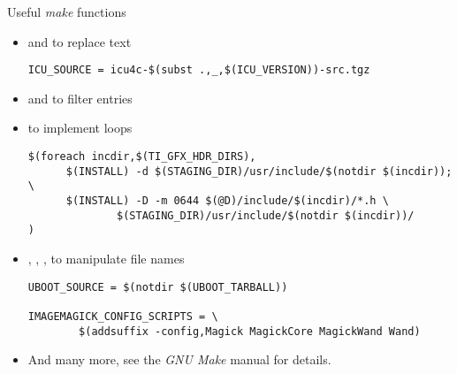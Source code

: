 \begin{frame}[fragile]{Useful {\em make} functions}
  \begin{itemize}
  \item {} and  to replace text
    \begin{block}{}
\begin{verbatim}
ICU_SOURCE = icu4c-$(subst .,_,$(ICU_VERSION))-src.tgz
\end{verbatim}
    \end{block}
  \item {} and  to filter entries
  \item {} to implement loops
\begin{block}{}
\begin{verbatim}
$(foreach incdir,$(TI_GFX_HDR_DIRS),
      $(INSTALL) -d $(STAGING_DIR)/usr/include/$(notdir $(incdir)); \
      $(INSTALL) -D -m 0644 $(@D)/include/$(incdir)/*.h \
              $(STAGING_DIR)/usr/include/$(notdir $(incdir))/
)
\end{verbatim}
\end{block}
  \item {}, , , 
    to manipulate file names
    \begin{block}{}
\begin{verbatim}
UBOOT_SOURCE = $(notdir $(UBOOT_TARBALL))

IMAGEMAGICK_CONFIG_SCRIPTS = \
        $(addsuffix -config,Magick MagickCore MagickWand Wand)
\end{verbatim}
    \end{block}
  \item And many more, see the {\em GNU Make} manual for details.
  \end{itemize}
\end{frame}

